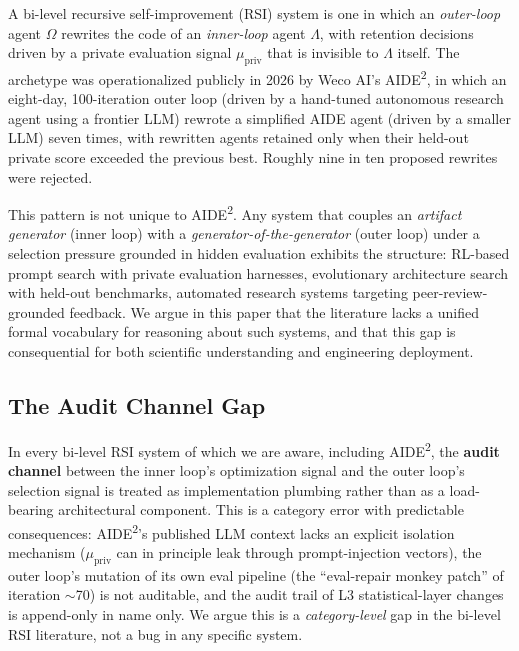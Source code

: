 
A bi-level recursive self-improvement (RSI) system is one in which an \emph{outer-loop} agent $\Omega$ rewrites the code of an \emph{inner-loop} agent $\Lambda$, with retention decisions driven by a private evaluation signal $\mu_{\text{priv}}$ that is invisible to $\Lambda$ itself. The archetype was operationalized publicly in 2026 by Weco AI's AIDE\textsuperscript{2}, in which an eight-day, 100-iteration outer loop (driven by a hand-tuned autonomous research agent using a frontier LLM) rewrote a simplified AIDE agent (driven by a smaller LLM) seven times, with rewritten agents retained only when their held-out private score exceeded the previous best. Roughly nine in ten proposed rewrites were rejected.

This pattern is not unique to AIDE\textsuperscript{2}. Any system that couples an \emph{artifact generator} (inner loop) with a \emph{generator-of-the-generator} (outer loop) under a selection pressure grounded in hidden evaluation exhibits the structure: RL-based prompt search with private evaluation harnesses, evolutionary architecture search with held-out benchmarks, automated research systems targeting peer-review-grounded feedback. We argue in this paper that the literature lacks a unified formal vocabulary for reasoning about such systems, and that this gap is consequential for both scientific understanding and engineering deployment.

\subsection{The Audit Channel Gap}

In every bi-level RSI system of which we are aware, including AIDE\textsuperscript{2}, the \textbf{audit channel} between the inner loop's optimization signal and the outer loop's selection signal is treated as implementation plumbing rather than as a load-bearing architectural component. This is a category error with predictable consequences: AIDE\textsuperscript{2}'s published LLM context lacks an explicit isolation mechanism ($\mu_{\text{priv}}$ can in principle leak through prompt-injection vectors), the outer loop's mutation of its own eval pipeline (the ``eval-repair monkey patch'' of iteration $\sim$70) is not auditable, and the audit trail of L3 statistical-layer changes is append-only in name only. We argue this is a \emph{category-level} gap in the bi-level RSI literature, not a bug in any specific system.

